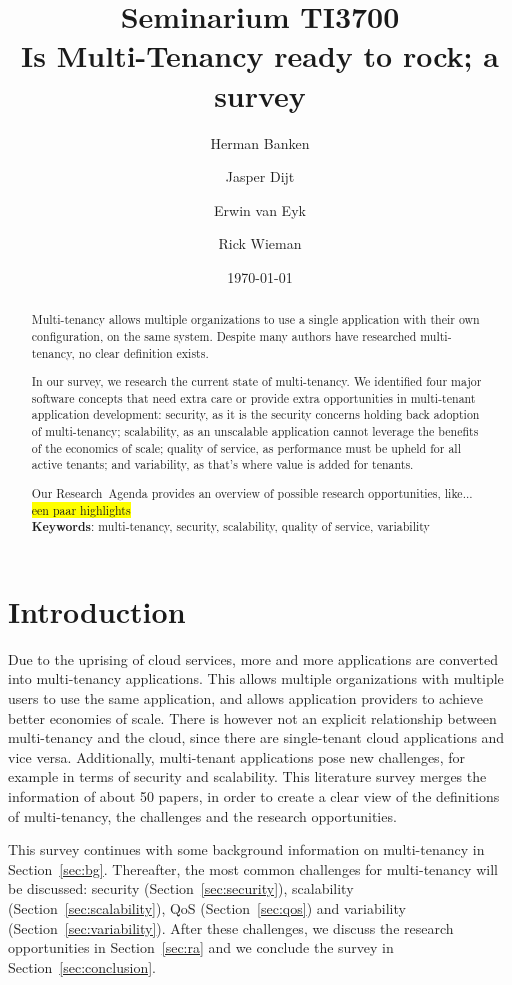 \documentclass{article}
\title{Seminarium TI3700\\ Is Multi-Tenancy ready to rock; a survey}
\author{Herman Banken\and
    Jasper Dijt\and
    Erwin van Eyk\and
    Rick Wieman}
\date{\today}
\newcommand{\highlight}[1]{\colorbox{yellow}{#1}}
\begin{document}
\maketitle
\thispagestyle{empty}

\begin{abstract}
Multi-tenancy allows multiple organizations to use a single application with their own configuration, on the same system. Despite many authors have researched multi-tenancy, no clear definition exists.

In our survey, we research the current state of multi-tenancy. We identified four major software concepts that need extra care or provide extra opportunities in multi-tenant application development: 
security, as it is the security concerns holding back adoption of multi-tenancy; %
scalability, as an unscalable application cannot leverage the benefits of the economics of scale;
quality of service, as performance must be upheld for all active tenants;
and variability, as that's where value is added for tenants.  

Our Research~Agenda provides an overview of possible research opportunities, 
like... \highlight{een paar highlights}%
\\

\textbf{Keywords}: multi-tenancy, security, scalability, quality of service, variability
\end{abstract}

\section{Introduction}
Due to the uprising of cloud services, more and more applications are converted into multi-tenancy applications. 
This allows multiple organizations with multiple users to use the same application, and allows application providers to achieve better economies of scale. 
There is however not an explicit relationship between multi-tenancy and the cloud, since there are single-tenant cloud applications and vice versa. 
Additionally, multi-tenant applications pose new challenges, for example in terms of security and scalability. 
This literature survey merges the information of about 50 papers, in order to create a clear view of the definitions of multi-tenancy, the challenges and the research opportunities.

This survey continues with some background information on multi-tenancy in Section~\ref{sec:bg}. Thereafter, the most common challenges for multi-tenancy will be discussed: security (Section~\ref{sec:security}), scalability (Section~\ref{sec:scalability}), \ac{QoS} (Section~\ref{sec:qos}) and variability (Section~\ref{sec:variability}). After these challenges, we discuss the research opportunities in Section~\ref{sec:ra} and we conclude the survey in Section~\ref{sec:conclusion}. %
\end{document}
